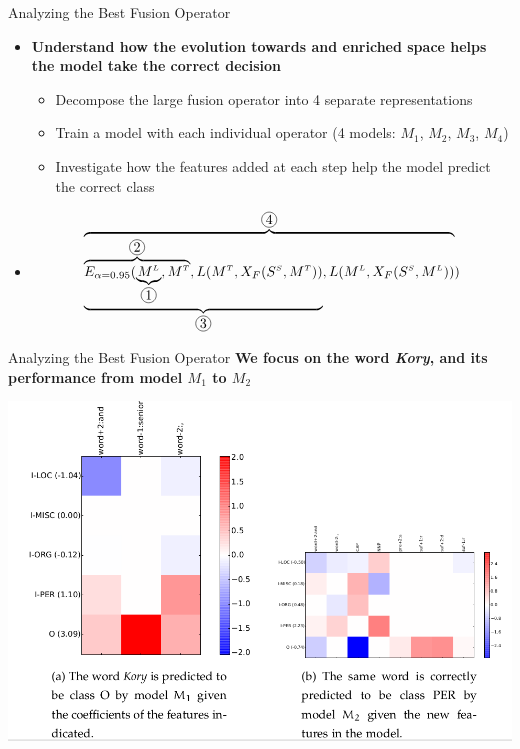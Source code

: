 \documentclass[10pt,xcolor=table]{beamer}
\newcommand*\circled[1]{\tikz[baseline=(char.base)]{
            \node[shape=circle,draw,inner sep=1pt] (char) {#1};}}
\newcommand\mlex{M^{\scriptscriptstyle L}}
\newcommand\mstd{M^{\scriptscriptstyle T}}
\newcommand\ssyn{S^{\scriptscriptstyle S}}
\begin{document}
\begin{frame}{Analyzing the Best Fusion Operator}
\begin{itemize}[<+- | alert@+>]
\item \large \textbf{Understand how the evolution towards and enriched space helps the model take the correct decision}
\begin{itemize}
\item Decompose the large fusion operator into 4 separate representations
\item Train a model with each individual operator (4 models: $M_1$, $M_2$, $M_3$, $M_4$)
\item Investigate how the features added at each step help the model predict the correct class
\end{itemize}
\item[] \begin{equation*}
\overbrace{\underbrace{\overbrace{E_{\alpha=0.95}(\underbrace{\mlex}_{\circled{1}},\mstd}^{\circled{2}},L(\mstd, X_F(\ssyn, \mstd))}_{\circled{3}}, L(\mlex, X_F(\ssyn, \mlex))}^{\circled{4}})
\end{equation*}

\end{itemize}


\end{frame}


\begin{frame}{Analyzing the Best Fusion Operator}
\large \textbf{We focus on the word \textit{Kory}, and its performance from model $M_1$ to $M_2$}
\begin{center}
\includegraphics[width=0.6\linewidth]{image2/Chapitre4/fanal1.png}
\end{center}
\end{frame}
\end{document}
